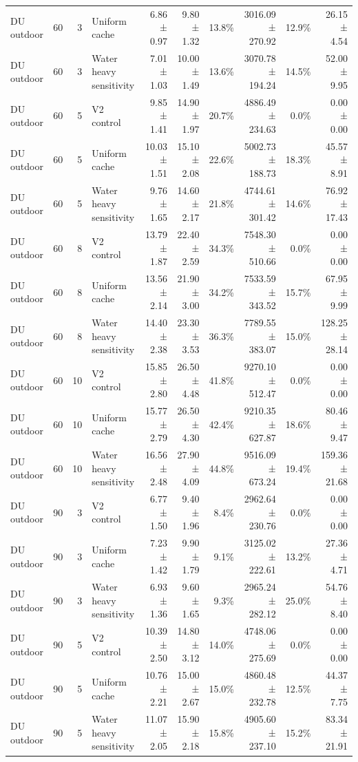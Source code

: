 \documentclass[10pt,a4paper]{article}
\begin{document}
\begin{landscape}
\begin{longtable}{@{}llrlrrrrrr@{}}
DU outdoor & 60 & 3 & Uniform cache & 6.86 ± 0.97 & 9.80 ± 1.32 & 13.8\% & 3016.09 ± 270.92 & 12.9\% & 26.15 ± 4.54 \\
DU outdoor & 60 & 3 & Water heavy sensitivity & 7.01 ± 1.03 & 10.00 ± 1.49 & 13.6\% & 3070.78 ± 194.24 & 14.5\% & 52.00 ± 9.95 \\
DU outdoor & 60 & 5 & V2 control & 9.85 ± 1.41 & 14.90 ± 1.97 & 20.7\% & 4886.49 ± 234.63 & 0.0\% & 0.00 ± 0.00 \\
DU outdoor & 60 & 5 & Uniform cache & 10.03 ± 1.51 & 15.10 ± 2.08 & 22.6\% & 5002.73 ± 188.73 & 18.3\% & 45.57 ± 8.91 \\
DU outdoor & 60 & 5 & Water heavy sensitivity & 9.76 ± 1.65 & 14.60 ± 2.17 & 21.8\% & 4744.61 ± 301.42 & 14.6\% & 76.92 ± 17.43 \\
DU outdoor & 60 & 8 & V2 control & 13.79 ± 1.87 & 22.40 ± 2.59 & 34.3\% & 7548.30 ± 510.66 & 0.0\% & 0.00 ± 0.00 \\
DU outdoor & 60 & 8 & Uniform cache & 13.56 ± 2.14 & 21.90 ± 3.00 & 34.2\% & 7533.59 ± 343.52 & 15.7\% & 67.95 ± 9.99 \\
DU outdoor & 60 & 8 & Water heavy sensitivity & 14.40 ± 2.38 & 23.30 ± 3.53 & 36.3\% & 7789.55 ± 383.07 & 15.0\% & 128.25 ± 28.14 \\
DU outdoor & 60 & 10 & V2 control & 15.85 ± 2.80 & 26.50 ± 4.48 & 41.8\% & 9270.10 ± 512.47 & 0.0\% & 0.00 ± 0.00 \\
DU outdoor & 60 & 10 & Uniform cache & 15.77 ± 2.79 & 26.50 ± 4.30 & 42.4\% & 9210.35 ± 627.87 & 18.6\% & 80.46 ± 9.47 \\
DU outdoor & 60 & 10 & Water heavy sensitivity & 16.56 ± 2.48 & 27.90 ± 4.09 & 44.8\% & 9516.09 ± 673.24 & 19.4\% & 159.36 ± 21.68 \\
DU outdoor & 90 & 3 & V2 control & 6.77 ± 1.50 & 9.40 ± 1.96 & 8.4\% & 2962.64 ± 230.76 & 0.0\% & 0.00 ± 0.00 \\
DU outdoor & 90 & 3 & Uniform cache & 7.23 ± 1.42 & 9.90 ± 1.79 & 9.1\% & 3125.02 ± 222.61 & 13.2\% & 27.36 ± 4.71 \\
DU outdoor & 90 & 3 & Water heavy sensitivity & 6.93 ± 1.36 & 9.60 ± 1.65 & 9.3\% & 2965.24 ± 282.12 & 25.0\% & 54.76 ± 8.40 \\
DU outdoor & 90 & 5 & V2 control & 10.39 ± 2.50 & 14.80 ± 3.12 & 14.0\% & 4748.06 ± 275.69 & 0.0\% & 0.00 ± 0.00 \\
DU outdoor & 90 & 5 & Uniform cache & 10.76 ± 2.21 & 15.00 ± 2.67 & 15.0\% & 4860.48 ± 232.78 & 12.5\% & 44.37 ± 7.75 \\
DU outdoor & 90 & 5 & Water heavy sensitivity & 11.07 ± 2.05 & 15.90 ± 2.18 & 15.8\% & 4905.60 ± 237.10 & 15.2\% & 83.34 ± 21.91 \\

\end{longtable}
\end{landscape}
\end{document}
